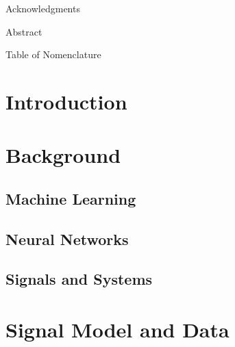 \documentclass[12pt]{article}
\begin{document}
\newpage
{}
\setcounter{page}{1}

\newpage

\begin{center}
{\Large Acknowledgments} \\

\vspace{1in}
\end{center}



\newpage

\begin{center}
{\Large Abstract} \\

\vspace{1in}
\end{center}
{
    \fontsize{12pt}{24pt}\selectfont
    
}



\newpage

\tableofcontents

\newpage

\listoffigures

\newpage

Table of Nomenclature

\clearpage
\setcounter{page}{1}

\fontsize{12pt}{24pt}\selectfont
\section{Introduction}

\newpage

\section{Background}
\subsection{Machine Learning}

\subsection{Neural Networks}

\subsection{Signals and Systems}

\newpage

\section{Signal Model and Data}

\newpage
\end{document}
